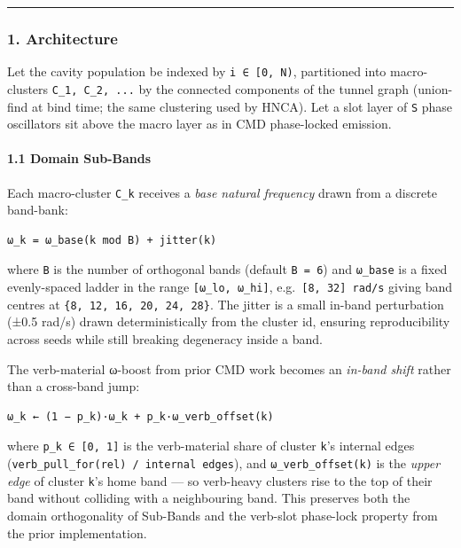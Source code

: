 \documentclass[
  11pt,
  a4paper,
]{article}
\begin{document}
\begin{center}\rule{0.5\linewidth}{0.5pt}\end{center}

\subsubsection{1. Architecture}\label{architecture-1}

Let the cavity population be indexed by \texttt{i\ ∈\ {[}0,\ N)},
partitioned into macro-clusters \texttt{C\_1,\ C\_2,\ ...} by the
connected components of the tunnel graph (union-find at bind time; the
same clustering used by HNCA). Let a slot layer of \texttt{S} phase
oscillators sit above the macro layer as in CMD phase-locked emission.

\paragraph{1.1 Domain Sub-Bands}\label{domain-sub-bands}

Each macro-cluster \texttt{C\_k} receives a \emph{base natural
frequency} drawn from a discrete band-bank:

\begin{verbatim}
ω_k = ω_base(k mod B) + jitter(k)
\end{verbatim}

where \texttt{B} is the number of orthogonal bands (default
\texttt{B\ =\ 6}) and \texttt{ω\_base} is a fixed evenly-spaced ladder
in the range \texttt{{[}ω\_lo,\ ω\_hi{]}},
e.g.~\texttt{{[}8,\ 32{]}\ rad/s} giving band centres at
\texttt{\{8,\ 12,\ 16,\ 20,\ 24,\ 28\}}. The jitter is a small in-band
perturbation (±0.5 rad/s) drawn deterministically from the cluster id,
ensuring reproducibility across seeds while still breaking degeneracy
inside a band.

The verb-material ω-boost from prior CMD work becomes an \emph{in-band
shift} rather than a cross-band jump:

\begin{verbatim}
ω_k ← (1 − p_k)·ω_k + p_k·ω_verb_offset(k)
\end{verbatim}

where \texttt{p\_k\ ∈\ {[}0,\ 1{]}} is the verb-material share of
cluster \texttt{k}'s internal edges
(\texttt{verb\_pull\_for(rel)\ /\ \textbar{}internal\ edges\textbar{}}),
and \texttt{ω\_verb\_offset(k)} is the \emph{upper edge} of cluster
\texttt{k}'s home band --- so verb-heavy clusters rise to the top of
their band without colliding with a neighbouring band. This preserves
both the domain orthogonality of Sub-Bands and the verb-slot phase-lock
property from the prior implementation.
\end{document}
